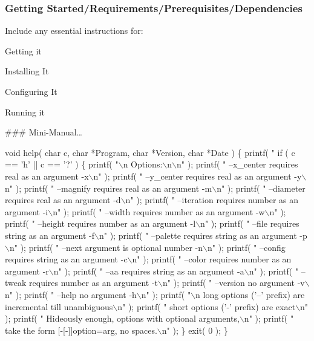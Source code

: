 \subsubsection*{Getting Started/\+Requirements/\+Prerequisites/\+Dependencies}

Include any essential instructions for\+:
\begin{DoxyItemize}
\item Getting it
\item Installing It
\item Configuring It
\item Running it
\end{DoxyItemize}

\#\#\# Mini-\/\+Manual… 
\begin{DoxyCode}
void help( char c, char *Program, char *Version, char *Date ) \{
    printf( "%
    if ( c == 'h' || c == '?' ) \{
        printf( "\(\backslash\)n  Options:\(\backslash\)n\(\backslash\)n" );
        printf( "  --x\_center    requires real as an argument   -x\(\backslash\)n" );
        printf( "  --y\_center    requires real as an argument   -y\(\backslash\)n" );
        printf( "  --magnify     requires real as an argument   -m\(\backslash\)n" );
        printf( "  --diameter    requires real as an argument   -d\(\backslash\)n" );
        printf( "  --iteration   requires number as an argument -i\(\backslash\)n" );
        printf( "  --width       requires number as an argument -w\(\backslash\)n" );
        printf( "  --height      requires number as an argument -l\(\backslash\)n" );
        printf( "  --file        requires string as an argument -f\(\backslash\)n" );
        printf( "  --palette     requires string as an argument -p\(\backslash\)n" );
        printf( "  --next        argument is optional number    -n\(\backslash\)n" );
        printf( "  --config      requires string as an argument -c\(\backslash\)n" );
        printf( "  --color       requires number as an argument -r\(\backslash\)n" );
        printf( "  --aa          requires string as an argument -a\(\backslash\)n" );
        printf( "  --tweak       requires number as an argument -t\(\backslash\)n" );
        printf( "  --version     no argument                    -v\(\backslash\)n" );
        printf( "  --help        no argument                    -h\(\backslash\)n" );
        printf( "\(\backslash\)n  long options ('--' prefix) are incremental till unambiguous\(\backslash\)n" );
        printf( "  short options ('-' prefix) are exact\(\backslash\)n" );
        printf( "  Hideously enough, options with optional arguments,\(\backslash\)n" );
        printf( "  take the form [-[-]]option=arg, no spaces.\(\backslash\)n" );
    \}
    exit( 0 );
\}
\end{DoxyCode}


